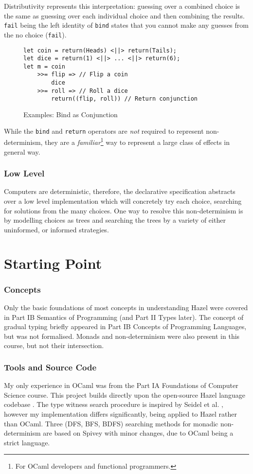 Distributivity represents this interpretation:  guessing over a combined choice is the same as guessing over each individual choice and then combining the results. \texttt{fail} being the left identity of \texttt{bind} states that you cannot make any guesses from the no choice (\texttt{fail}). 
\begin{figure}[h]\centering
\begin{verbatim}
let coin = return(Heads) <||> return(Tails);
let dice = return(1) <||> ... <||> return(6);
let m = coin 
    >>= flip => // Flip a coin
        dice
    >>= roll => // Roll a dice
        return((flip, roll)) // Return conjunction
\end{verbatim}
\caption{Examples: Bind as Conjunction}
\label{fig:Conjunction}
\end{figure}

While the \texttt{bind} and \texttt{return} operators are \textit{not} required to represent non-determinism, they are a \textit{familiar}\footnote{For OCaml developers and functional programmers.} way to represent a large class of effects in general way. 

\subsubsection{Low Level}
Computers are deterministic, therefore, the declarative specification abstracts over a low level implementation which will concretely try each choice, searching for solutions from the many choices. One way to resolve this non-determinism is by modelling choices as trees and searching the trees by a variety of either uninformed, or informed strategies.

\section{Starting Point}\label{sec:StartingPoint}
\subsubsection{Concepts}
Only the basic foundations of most concepts in understanding Hazel were covered in Part IB Semantics of Programming (and Part II Types later). The concept of gradual typing briefly appeared in Part IB Concepts of Programming Languages, but was not formalised. Monads and non-determinism were also present in this course, but not their intersection.

\subsubsection{Tools and Source Code}
My only experience in OCaml was from the Part IA Foundations of Computer Science course. This project builds directly upon the open-source Hazel language codebase \cite{HazelCode}. The type witness search procedure is inspired by Seidel et al. \cite{SearchProc}, however my implementation differs significantly, being applied to Hazel rather than OCaml. Three (DFS, BFS, BDFS) searching methods for monadic non-determinism are based on Spivey \cite{Bunches} with minor changes, due to OCaml being a strict language.

